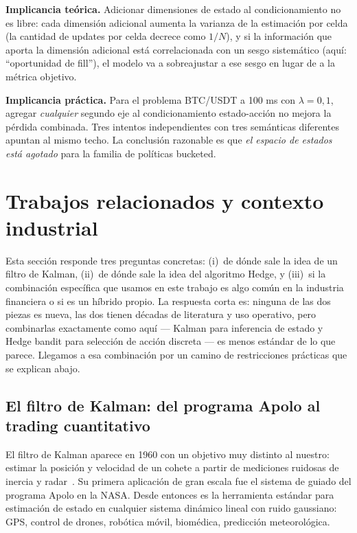 \documentclass[journal,onecolumn,11pt]{IEEEtran}
\begin{document}
\medskip

\noindent
\textbf{Implicancia teórica.} Adicionar dimensiones de estado al
condicionamiento no es libre: cada dimensión adicional aumenta la
varianza de la estimación por celda (la cantidad de updates por
celda decrece como $1/N$), y si la información que aporta la
dimensión adicional está correlacionada con un sesgo sistemático
(aquí: ``oportunidad de fill''), el modelo va a sobreajustar a ese
sesgo en lugar de a la métrica objetivo.

\medskip

\noindent
\textbf{Implicancia práctica.} Para el problema BTC/USDT a 100 ms con
$\lambda=0{,}1$, agregar \emph{cualquier} segundo eje al
condicionamiento estado-acción no mejora la pérdida combinada. Tres
intentos independientes con tres semánticas diferentes apuntan al
mismo techo. La conclusión razonable es que \emph{el espacio de
estados está agotado} para la familia de políticas bucketed.

\section{Trabajos relacionados y contexto industrial}\label{sec:related}

Esta sección responde tres preguntas concretas: (i)~de dónde sale la
idea de un filtro de Kalman, (ii)~de dónde sale la idea del algoritmo
Hedge, y (iii)~si la combinación específica que usamos en este trabajo
es algo común en la industria financiera o si es un híbrido propio.
La respuesta corta es: ninguna de las dos piezas es nueva, las dos
tienen décadas de literatura y uso operativo, pero combinarlas
exactamente como aquí --- Kalman para inferencia de estado y Hedge
bandit para selección de acción discreta --- es menos estándar de lo
que parece. Llegamos a esa combinación por un camino de restricciones
prácticas que se explican abajo.

\subsection{El filtro de Kalman: del programa Apolo al trading
            cuantitativo}

El filtro de Kalman aparece en 1960 con un objetivo muy distinto al
nuestro: estimar la posición y velocidad de un cohete a partir de
mediciones ruidosas de inercia y radar~\cite{kalman1960}. Su primera
aplicación de gran escala fue el sistema de guiado del programa
Apolo en la NASA. Desde entonces es la herramienta estándar para
estimación de estado en cualquier sistema dinámico lineal con ruido
gaussiano: GPS, control de drones, robótica móvil, biomédica,
predicción meteorológica.
\end{document}
